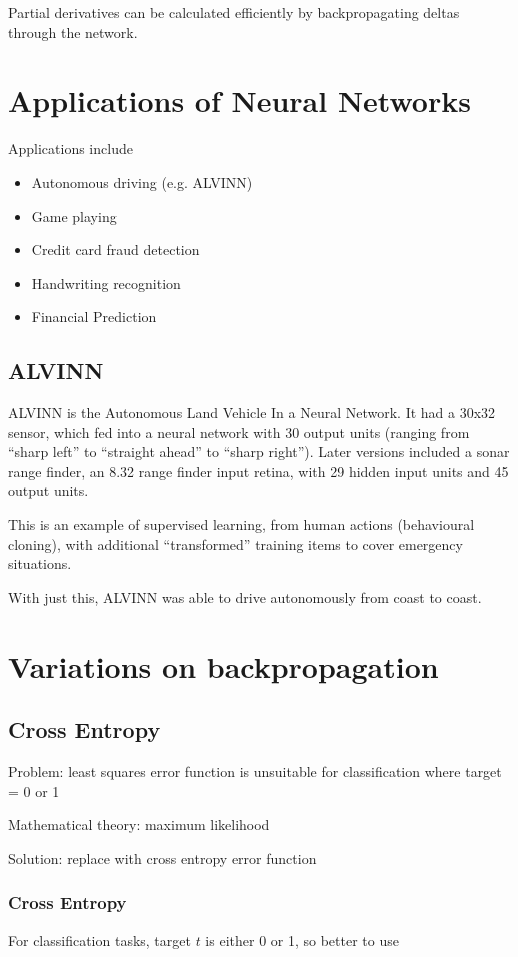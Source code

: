 Partial derivatives can be calculated efficiently by backpropagating deltas
through the network.

\section{Applications of Neural Networks}
Applications include
\begin{itemize}
    \item Autonomous driving (e.g. ALVINN)
    \item Game playing
    \item Credit card fraud detection
    \item Handwriting recognition
    \item Financial Prediction
\end{itemize}

\subsection{ALVINN}
ALVINN is the Autonomous Land Vehicle In a Neural Network. It had a 30x32
sensor, which fed into a neural network with 30 output units (ranging from
``sharp left'' to ``straight ahead'' to ``sharp right''). Later versions
included a sonar range finder, an 8.32 range finder input retina, with 29
hidden input units and 45 output units.

This is an example of supervised learning, from human actions (behavioural
cloning), with additional ``transformed'' training items to cover emergency
situations.

With just this, ALVINN was able to drive autonomously from coast to coast.

\section{Variations on backpropagation}
\subsection{Cross Entropy}
Problem: least squares error function is unsuitable for classification where
target = 0 or 1

Mathematical theory: maximum likelihood

Solution: replace with cross entropy error function

\subsubsection{Cross Entropy}
For classification tasks, target $t$ is either 0 or 1, so better to use

